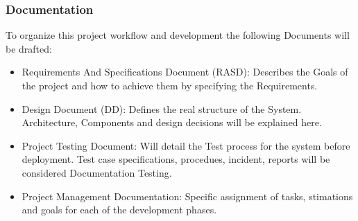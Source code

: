 \documentclass[a4paper]{article}
\begin{document}
\subsubsection{Documentation}
To organize this project workflow and development the following Documents will be drafted:
\begin {itemize}
\item Requirements And Specifications Document (RASD): Describes the Goals of the project and how to achieve them by specifying the Requirements.
\item Design Document (DD): Defines the real structure of the System. Architecture, Components and design decisions will be explained here.
\item Project Testing Document: Will detail the Test process for the system before deployment. Test case specifications, procedues, incident, reports will be considered Documentation Testing.
\item Project Management Documentation: Specific assignment of tasks, stimations and goals for each of the development phases.
\end{itemize}

\newpage
\end{document}
